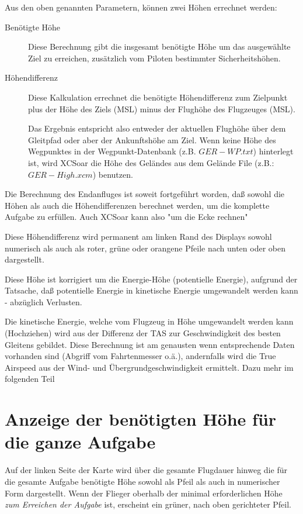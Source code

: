Aus den oben genannten Parametern, können zwei Höhen errechnet werden:

\begin{description}
\item[Benötigte Höhe]
Diese Berechnung gibt die insgesamt benötigte Höhe um das ausgewählte Ziel zu erreichen,
zusätzlich vom Piloten bestimmter Sicherheitshöhen.
\item[Höhendifferenz]
Diese Kalkulation errechnet die benötigte Höhendifferenz zum Zielpunkt  plus der Höhe des
Ziels (MSL) minus der Flughöhe des Flugzeuges (MSL).

Das Ergebnis entspricht also entweder der aktuellen Flughöhe über dem Gleitpfad oder aber der Ankunftshöhe am Ziel.
Wenn keine Höhe des Wegpunktes in der Wegpunkt-Datenbank (z.B. $GER-WP.txt$) hinterlegt ist, wird \textsf{XCSoar}
die Höhe des Geländes aus dem Gelände File (z.B.: $GER-High.xcm$) benutzen.
\end{description}

Die Berechnung des Endanfluges ist soweit fortgeführt worden, daß sowohl die Höhen als auch die Höhendifferenzen
berechnet werden, um die komplette Aufgabe zu erfüllen. Auch \textsf{XCSoar} kann also "um die Ecke rechnen"

Diese Höhendifferenz wird permanent am linken Rand des Displays sowohl numerisch als auch als roter,
grüne oder orangene  Pfeile nach unten oder oben dargestellt.

Diese Höhe ist korrigiert um die Energie-Höhe (potentielle Energie), aufgrund der Tatsache, daß potentielle
Energie in kinetische Energie umgewandelt werden kann - abzüglich Verlusten.

Die kinetische Energie, welche vom Flugzeug in Höhe umgewandelt werden kann (Hochziehen) wird aus der
Differenz der TAS zur Geschwindigkeit des besten Gleitens gebildet. Diese Berechnung ist am genausten wenn
entsprechende Daten vorhanden sind (Abgriff vom Fahrtenmesser o.ä.), andernfalls wird die True Airspeed
aus der Wind- und Übergrundgeschwindigkeit ermittelt. Dazu mehr im folgenden Teil

\section{Anzeige der benötigten Höhe für die ganze Aufgabe}

Auf der linken Seite der Karte wird über die gesamte Flugdauer hinweg die für die gesamte Aufgabe benötigte
Höhe sowohl als Pfeil als auch in numerischer Form dargestellt.  Wenn der Flieger oberhalb der minimal erforderlichen Höhe \emph{zum Erreichen der Aufgabe} ist, erscheint ein grüner, nach oben gerichteter Pfeil.
 
